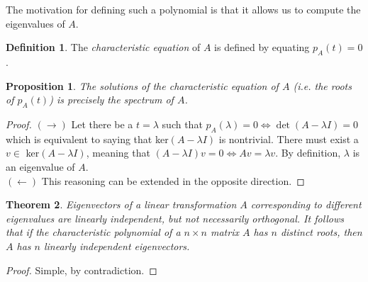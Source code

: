 \documentclass{article}
\newtheorem{theorem}{Theorem}[section]
\newtheorem{proposition}[theorem]{Proposition}
\theoremstyle{remark}
\theoremstyle{definition}
\newtheorem{definition}{Definition}[section]
\begin{document}
    The motivation for defining such a polynomial is that it allows us to compute the eigenvalues of $A$. 
    \begin{definition}
    The \textit{characteristic equation} of $A$ is defined by equating $p_A (t) = 0$. 
    \end{definition}

    \begin{proposition}
    The solutions of the characteristic equation of $A$ (i.e. the roots of $p_A (t)$) is precisely the spectrum of $A$. 
    \end{proposition}

    \begin{proof} $(\rightarrow)$ Let there be a $t = \lambda$ such that $p_A (\lambda) = 0 \iff \det{(A - \lambda I)} = 0$ which is equivalent to saying that ker$(A - \lambda I)$ is nontrivial. There must exist a $v \in $ ker$(A - \lambda I)$, meaning that $(A - \lambda I) v = 0 \iff A v = \lambda v$. By definition, $\lambda$ is an eigenvalue of $A$. \\
    $(\leftarrow)$ This reasoning can be extended in the opposite direction. 
    \end{proof}

    \begin{theorem}
    Eigenvectors of a linear transformation $A$ corresponding to different eigenvalues are linearly independent, but not necessarily orthogonal. It follows that if the characteristic polynomial of a $n \times n$ matrix $A$ has $n$ distinct roots, then $A$ has $n$ linearly independent eigenvectors. 
    \end{theorem}

    \begin{proof}
    Simple, by contradiction.
    \end{proof}
\end{document}
